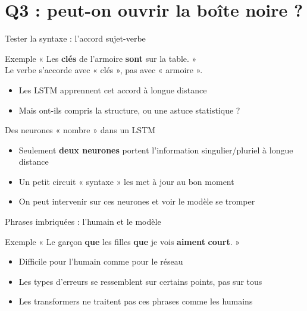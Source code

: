 \section{Q3 : peut-on ouvrir la boîte noire ?}

\begin{frame}{Tester la syntaxe : l'accord sujet-verbe}
\begin{block}{Exemple}
    « Les \textbf{clés} de l'armoire \textbf{sont} sur la table. » \\
    Le verbe s'accorde avec « clés », pas avec « armoire ».
\end{block}
\begin{itemize}
    \item Les LSTM apprennent cet accord à longue distance
    \item Mais ont-ils compris la structure, ou une astuce statistique ?
\end{itemize}
\end{frame}

\begin{frame}{Des neurones « nombre » dans un LSTM}
\begin{itemize}
    \item Seulement \textbf{deux neurones} portent l'information singulier/pluriel à longue distance
    \item Un petit circuit « syntaxe » les met à jour au bon moment
    \item On peut intervenir sur ces neurones et voir le modèle se tromper
\end{itemize}
\end{frame}

\begin{frame}{Phrases imbriquées : l'humain et le modèle}
\begin{block}{Exemple}
    « Le garçon \textbf{que} les filles \textbf{que} je vois \textbf{aiment} \textbf{court}. »
\end{block}
\begin{itemize}
    \item Difficile pour l'humain comme pour le réseau
    \item Les types d'erreurs se ressemblent sur certains points, pas sur tous
    \item Les transformers ne traitent pas ces phrases comme les humains
\end{itemize}
\end{frame}

